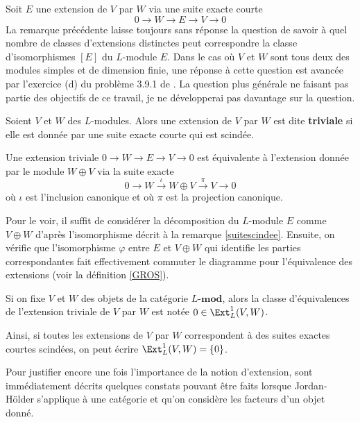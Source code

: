 \begin{Rem} Soit $E$ une extension de $V$ par $W$ via une suite exacte courte
$$ 0 \rightarrow W \rightarrow E \rightarrow V \rightarrow 0 $$
La remarque précédente laisse toujours sans réponse la question de savoir à quel nombre de classes d'extensions distinctes peut correspondre la classe d'isomorphismes $[E]$ du $L$-module $E$. Dans le cas où $V$ et $W$ sont tous deux des modules simples et de dimension finie, une réponse à cette question est avancée par l'exercice (d) du problème 3.9.1 de \cite{Etingof}. La question plus générale ne faisant pas partie des objectifs de ce travail, je ne développerai pas davantage sur la question.
\end{Rem}

\begin{Def} Soient $V$ et $W$ des $L$-modules. Alors une extension de $V$ par $W$ est dite \textbf{triviale} si elle est donnée par une suite exacte courte qui est scindée.
\end{Def}

\begin{Rem} \label{zeroext} Une extension triviale $0 \rightarrow W \rightarrow E \rightarrow V \rightarrow 0$ est équivalente à l'extension donnée par le module $W \oplus V$ via la suite exacte
$$ 0 \rightarrow W \stackrel{\iota}{\longrightarrow} W \oplus V \stackrel{\pi}{\longrightarrow} V \rightarrow 0 $$
où $\iota$ est l'inclusion canonique et où $\pi$ est la projection canonique.

Pour le voir, il suffit de considérer la décomposition du $L$-module $E$ comme $V \oplus W$ d'après l'isomorphisme décrit à la remarque \ref{suitescindee}. Ensuite, on vérifie que l'isomorphisme $\varphi$ entre $E$ et $V \oplus W$ qui identifie les parties correspondantes fait effectivement commuter le diagramme pour l'équivalence des extensions (voir la définition \ref{GROS}).
\end{Rem}

\begin{Rem} Si on fixe $V$ et $W$ des objets de la catégorie $L$-$\mathbf{mod}$, alors la classe d'équivalences de l'extension triviale de $V$ par $W$ est notée $0 \in \Ext_L^1(V,W)$.

Ainsi, si toutes les extensions de $V$ par $W$ correspondent à des suites exactes courtes scindées, on peut écrire $\Ext_L^1(V,W) = \{0\}$.
\end{Rem}


Pour justifier encore une fois l'importance de la notion d'extension, sont immédiatement décrits quelques constats pouvant être faits lorsque Jordan-Hölder s'applique à une catégorie et qu'on considère les facteurs d'un objet donné.

